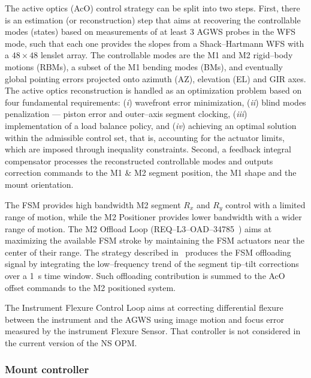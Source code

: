\documentclass{gmto}
\begin{document}
The active optics (AcO) control strategy can be split into two steps. %
First, there is an estimation (or reconstruction) step that aims at recovering the controllable modes (states) based on measurements of at least 3 AGWS probes in the WFS mode, such that each one provides the slopes from a Shack--Hartmann WFS with a $48 \times 48$ lenslet array. The controllable modes are the M1 and M2 rigid--body motions (RBMs), a subset of the M1 bending modes (BMs), and eventually global pointing errors projected onto azimuth (AZ), elevation (EL) and GIR axes. The active optics reconstruction is handled as an optimization problem based on four fundamental requirements: ({\it i}) wavefront error minimization, ({\it ii}) blind modes penalization --- piston error and outer--axis segment clocking, ({\it iii}) implementation of a load balance policy, and ({\it iv}) achieving an optimal solution within the admissible control set, that is, accounting for the actuator limits, which are imposed through inequality constraints. Second, a feedback integral compensator processes the reconstructed controllable modes and outputs correction commands to the M1 \& M2 segment position, the M1 shape and the mount orientation.

The FSM provides high bandwidth M2 segment $R_x$ and $R_y$ control with a limited range of motion, while the M2 Positioner provides lower bandwidth with a wider range of motion. The M2 Offload Loop (REQ--L3--OAD--34785~\cite{OAD}) aims at maximizing the available FSM stroke by maintaining the FSM actuators near the center of their range. The strategy described in~\cite[Section 6.4]{GMTO.NS.Alg.DOC} produces the FSM offloading signal by integrating the low--frequency trend of the segment tip--tilt corrections over a \SI{1}{s} time window. Such offloading contribution is summed to the AcO offset commands to the M2 positioned system.

The Instrument Flexure Control Loop aims at correcting differential flexure between the instrument and the AGWS using image motion and focus error measured by the instrument Flexure Sensor. That controller is not considered in the current version of the NS OPM.

\subsubsection{Mount controller}
\label{sec:mount-ctrl}
\end{document}
